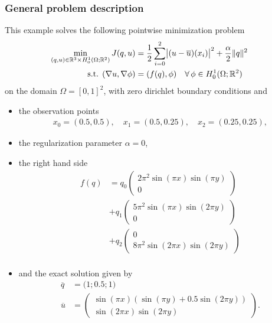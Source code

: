 \subsubsection{General problem description}
This example solves the following pointwise minimization problem
\begin{align*}
\min_{(q,u)\in \mathbb R^3 \times H_0^1(\Omega; \mathbb R^2)} J(q,u) &= \frac{1}{2} \sum_{i=0}^2\abs{(u-\overline u)(x_i)}^2 + \frac{\alpha}{2}\|q\|^2&&\\
\text{s.t. } (\nabla u,\nabla \phi) &= (f(q),\phi) \quad\forall\,\phi \in H^1_0(\Omega; \mathbb R^2)
\end{align*}
on the domain $\Omega = [0,1]^2$, with zero dirichlet boundary conditions and
\begin{itemize}
\item the observation points
\begin{align*}
x_0 = (0.5, 0.5), \quad x_1 = (0.5, 0.25),\quad x_2 = (0.25, 0.25),
\end{align*}
\item the regularization parameter $\alpha = 0$, 
\item the right hand side
\begin{align*}
 f(q) &= q_0 \left(\begin{matrix}2\pi^2  \sin( \pi x) \sin(\pi y)\\0 \end{matrix}\right)\\
      &+ q_1 \left(\begin{matrix}5\pi^2  \sin( \pi x) \sin(2\pi y)\\0 \end{matrix}\right)\\
      &+ q_2 \left(\begin{matrix}0 \\8\pi^2  \sin(2\pi x) \sin(2\pi y)\end{matrix}\right)\\
\end{align*}
\item and the exact solution given by 
\begin{align*}
 \overline{q} &= \bigl(1;0.5;1\bigr)\\
 \overline{u}& = \left(\begin{matrix} \sin( \pi x)( \sin(\pi y)+0.5\sin(2\pi y))\\\sin(2\pi x) \sin(2\pi y) \end{matrix}\right).
\end{align*}
\end{itemize}
